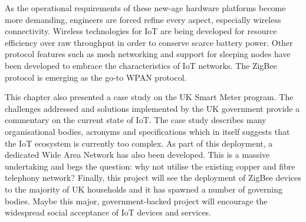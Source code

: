    As the operational requirements of these new-age hardware platforms become more demanding, engineers are forced refine every aspect, especially wireless connectivity. Wireless technologies for IoT are being developed for resource efficiency over raw throughput in order to conserve scarce battery power. Other protocol features such as mesh networking and support for sleeping nodes have been developed to embrace the characteristics of IoT networks. The ZigBee protocol is emerging as the go-to WPAN protocol.

    This chapter also presented a case study on the UK Smart Meter program. The challenges addressed and solutions implemented by the UK government provide a commentary on the current state of IoT. The case study describes many organisational bodies, acronyms and specifications which in itself suggests that the IoT ecosystem is currently too complex. As part of this deployment, a dedicated Wide Area Network has also been developed. This is a massive undertaking and begs the question: why not utilise the existing copper and fibre telephony network? Finally, this project will see the deployment of ZigBee devices to the majority of UK households and it has spawned a number of governing bodies. Maybe this major, government-backed project will encourage the widespread social acceptance of IoT devices and services.
